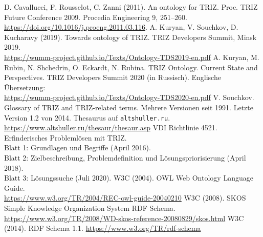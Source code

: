 \documentclass[11pt,a4paper]{article}
\begin{document}
\begin{thebibliography}{xxx}
 D. Cavallucci, F. Rousselot, C. Zanni (2011). An ontology
  for TRIZ. Proc. TRIZ Future Conference 2009. Procedia Engineering 9,
  251–260.\\  \url{https://doi.org/10.1016/j.proeng.2011.03.116}.
 A. Kuryan, V. Souchkov, D. Kucharavy (2019). Towards
  ontology of TRIZ. TRIZ Developers Summit, Minsk 2019.
  \\ \url{https://wumm-project.github.io/Texts/Ontology-TDS2019-en.pdf}
 A. Kuryan, M. Rubin, N. Shchedrin, O. Eckardt, N. Rubina.
  TRIZ Ontology. Current State and Perspectives. TRIZ Developers Summit 2020
  (in Russisch). Englische Übersetzung:
  \\ \url{https://wumm-project.github.io/Texts/Ontology-TDS2020-en.pdf}
 V. Souchkov. Glossary of TRIZ and TRIZ-related terms. Mehrere
  Versionen seit 1991. Letzte Version 1.2 von 2014.
 Thesaurus auf \texttt{altshuller.ru}.
  \url{https://www.altshuller.ru/thesaur/thesaur.asp}
 VDI Richtlinie 4521. Erfinderisches Problemlösen mit TRIZ.\\
  Blatt 1: Grundlagen und Begriffe (April 2016).\\ Blatt 2: Zielbeschreibung,
  Problemdefinition und Lösungspriorisierung (April 2018).\\ Blatt 3:
  Lösungssuche (Juli 2020). 
 W3C (2004). OWL Web Ontology Language Guide.\\
  \url{https://www.w3.org/TR/2004/REC-owl-guide-20040210}
 W3C (2008). SKOS Simple Knowledge Organization System RDF
  Schema.\\
  \url{https://www.w3.org/TR/2008/WD-skos-reference-20080829/skos.html}
 W3C (2014). RDF Schema 1.1.
  \url{https://www.w3.org/TR/rdf-schema}
\end{thebibliography}
\end{document}
